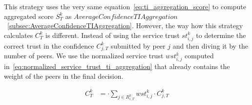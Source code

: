 This strategy uses the very same equation~\ref{eq:ti_aggregation_score} to compute aggregated score $S^{k}_{T}$ as $AverageConfidenceTIAggregation$~\ref{subsec:AverageConfidenceTIAggregation}.
However, the way how this strategy calculates $C^{k}_{T}$ is different. 
Instead of using the service trust $st^{k}_{i, j}$ to determine the correct trust in the confidence $C^{k}_{j, T}$ submitted by peer $j$ and then diving it by the number of peers.
We use the normalized service trust $wst^{k}_{i,j}$ computed in~\ref{eq:normalized_service_trust_ti_aggregation} that already contains the weight of the peers in the final decision.

\begin{equation}
\begin{split}
    C^{k}_{T} &= \cdot \sum_{{j}\in R^{k}_{i, T}} wst^{k}_{i,j} \cdot C^{k}_{j, T}
\end{split}
\end{equation}
